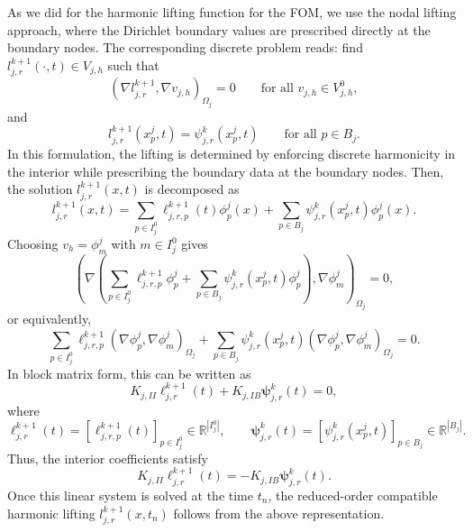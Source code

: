 \documentclass[a4paper, 11pt]{article}
\theoremstyle{remark}
\begin{document}
As we did for the harmonic lifting function for the FOM, we use the nodal lifting approach, where the Dirichlet boundary values are prescribed directly at the boundary nodes. The corresponding discrete problem reads: find $l_{j, r}^{k+1}(\cdot, t)\in V_{j, h}$ such that 
\begin{equation*}
    \left(\nabla l_{j, r}^{k+1}, \nabla v_{j, h}\right)_{\Omega_{j}} = 0 \qquad \text{for all } v_{j, h}\in V^{0}_{j, h},
\end{equation*}
and
\begin{equation*}
    l_{j, r}^{k+1}(x^{j}_{p}, t) = \psi_{j, r}^{k}(x^{j}_{p}, t) \qquad \text{for all } p\in B_{j}.
\end{equation*}
In this formulation, the lifting is determined by enforcing discrete harmonicity in the interior while prescribing the boundary data at the boundary nodes. Then, the solution $l_{j, r}^{k+1}(x, t)$ is decomposed as
\begin{equation*}
    l_{j, r}^{k+1}(x, t) = \sum_{p\in I^{0}_{j}} \ell_{j, r, p}^{k+1}(t)\phi^{j}_{p}(x) + \sum_{p\in B_{j}}\psi_{j, r}^{k}(x^{j}_{p}, t)\phi_{p}^{j}(x).
\end{equation*}
Choosing $v_h=\phi_m^j$ with $m\in I_j^0$ gives
\begin{equation*}
    \left(\nabla\left(\sum_{p\in I^{0}_{j}} \ell_{j, r, p}^{k+1}\phi^{j}_{p} + \sum_{p\in B_{j}}\psi_{j, r}^{k}(x^{j}_{p}, t)\phi^{j}_{p}\right), \nabla \phi^{j}_{m}\right)_{\Omega_{j}} = 0,
\end{equation*}
or equivalently,
\begin{equation*}
    \sum_{p\in I^{0}_{j}} \ell_{j, r, p}^{k+1}\left(\nabla\phi^{j}_{p}, \nabla\phi^{j}_{m}\right)_{\Omega_{j}} + \sum_{p\in B_{j}}\psi_{j, r}^{k}(x^{j}_{p}, t)\left(\nabla\phi^{j}_{p}, \nabla\phi^{j}_{m}\right)_{\Omega_{j}} = 0.
\end{equation*}
In block matrix form, this can be written as
\begin{equation*}
    K_{j, II}\boldsymbol{\ell}_{j, r}^{k+1}(t) + K_{j, IB}\boldsymbol{\psi}_{j, r}^{k}(t) = 0,
\end{equation*}
where
\begin{equation*}
    \boldsymbol{\ell}_{j, r}^{k+1}(t) = [\ell_{j, r, p}^{k+1}(t)]_{p\in I^{0}_{j}}\in\mathbb{R}^{|I^{0}_{j}|}, \qquad \boldsymbol{\psi}_{j, r}^{k}(t) = [\psi_{j, r}^{k}(x^{j}_{p}, t)]_{p\in B_{j}}\in\mathbb{R}^{|B_{j}|}.
\end{equation*}
Thus, the interior coefficients satisfy
\begin{equation*}
    K_{j, II}\boldsymbol{\ell}_{j, r}^{k+1}(t) = - K_{j, IB}\boldsymbol{\psi}_{j, r}^{k}(t).
\end{equation*}
Once this linear system is solved at the time $t_{n}$, the reduced-order compatible harmonic lifting $l_{j,r}^{k+1}(x,t_n)$ follows from the above representation.
\end{document}
